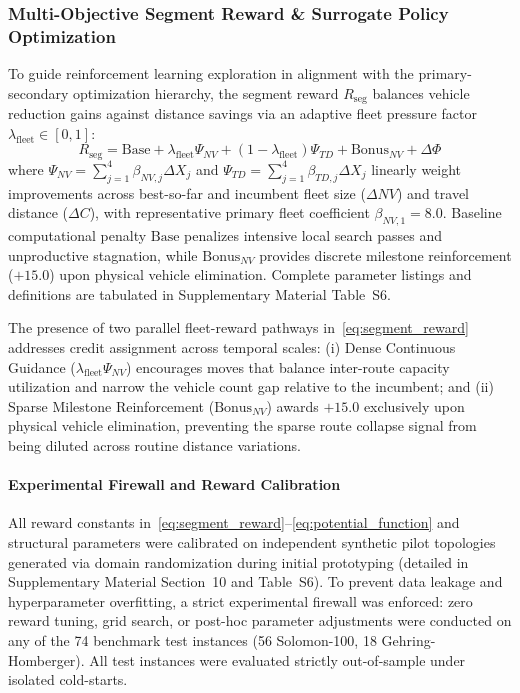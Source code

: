 \documentclass{ieeeaccess}
\begin{document}
\subsubsection{Multi-Objective Segment Reward \& Surrogate Policy Optimization}
To guide reinforcement learning exploration in alignment with the primary-secondary optimization hierarchy, the segment reward $R_{\text{seg}}$ balances vehicle reduction gains against distance savings via an adaptive fleet pressure factor $\lambda_{\text{fleet}} \in [0, 1]$:
\begin{equation}
  R_{\text{seg}} = \text{Base} + \lambda_{\text{fleet}} \Psi_{NV} + (1 - \lambda_{\text{fleet}}) \Psi_{TD} + \text{Bonus}_{NV} + \Delta \Phi
  \label{eq:segment_reward}
\end{equation}
where $\Psi_{NV} = \sum_{j=1}^4 \beta_{NV, j} \Delta X_j$ and \allowbreak $\Psi_{TD} = \sum_{j=1}^4 \beta_{TD, j} \Delta X_j$ linearly weight improvements across best-so-far and incumbent fleet size ($\Delta NV$) and travel distance ($\Delta C$), with representative primary fleet coefficient $\beta_{NV, 1} = 8.0$. Baseline computational penalty $\text{Base}$ penalizes intensive local search passes and unproductive stagnation, while $\text{Bonus}_{NV}$ provides discrete milestone reinforcement ($+15.0$) upon physical vehicle elimination. Complete parameter listings and definitions are tabulated in Supplementary Material Table~S6.

The presence of two parallel fleet-reward pathways in~\eqref{eq:segment_reward} addresses credit assignment across temporal scales: (i) Dense Continuous Guidance ($\lambda_{\text{fleet}} \Psi_{NV}$) encourages moves that balance inter-route capacity utilization and narrow the vehicle count gap relative to the incumbent; and (ii) Sparse Milestone Reinforcement ($\text{Bonus}_{NV}$) awards $+15.0$ exclusively upon physical vehicle elimination, preventing the sparse route collapse signal from being diluted across routine distance variations.

\paragraph{Experimental Firewall and Reward Calibration}
All reward constants in~\eqref{eq:segment_reward}--\eqref{eq:potential_function} and structural parameters were calibrated on independent synthetic pilot topologies generated via domain randomization during initial prototyping (detailed in Supplementary Material Section~10 and Table~S6). To prevent data leakage and hyperparameter overfitting, a strict experimental firewall was enforced: zero reward tuning, grid search, or post-hoc parameter adjustments were conducted on any of the 74 benchmark test instances (56 Solomon-100, 18 Gehring-Homberger). All test instances were evaluated strictly out-of-sample under isolated cold-starts.
\end{document}
